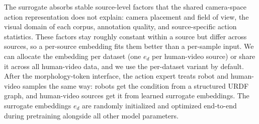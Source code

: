 The surrogate absorbs stable source-level factors that the shared camera-space action representation does not explain: camera placement and field of view, the visual domain of each corpus, annotation quality, and source-specific action statistics. These factors stay roughly constant within a source but differ across sources, so a per-source embedding fits them better than a per-sample input. We can allocate the embedding per dataset (one $e_{d}$ per human-video source) or share it across all human-video data, and we use the per-dataset variant by default. After the morphology-token interface, the action expert treats robot and human-video samples the same way: robots get the condition from a structured URDF graph, and human-video sources get it from learned surrogate embeddings. The surrogate embeddings $e_d$ are randomly initialized and optimized end-to-end during pretraining alongside all other model parameters.






